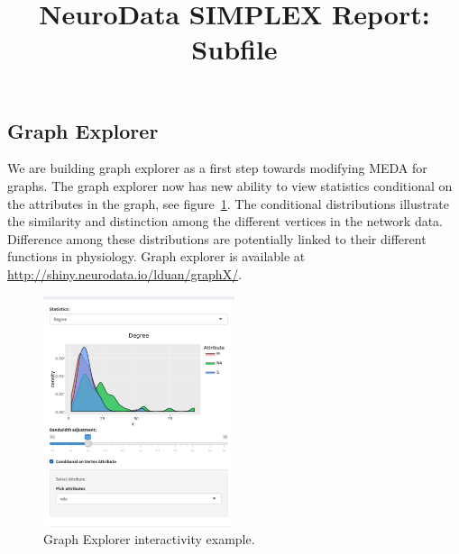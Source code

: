 \documentclass[simplex.tex]{subfiles}
\title{NeuroData SIMPLEX Report: Subfile}
\begin{document}

\subsection{Graph Explorer}

We are building graph explorer as a first step towards modifying MEDA for graphs.  
The graph explorer now has new ability to view statistics conditional on the attributes in the graph, see figure~\ref{fig:graphExplorer}. The conditional distributions illustrate
the similarity and distinction among the different vertices in the
network data. Difference among these distributions are potentially
linked to their different functions in physiology.
Graph explorer is available at \url{http://shiny.neurodata.io/lduan/graphX/}.


\begin{figure}[h!]
\begin{cframed}
\centering
\includegraphics[width=0.5\textwidth]{./figs/graph-explorer.png}
\caption{Graph Explorer interactivity example.}
\label{fig:graphExplorer}
\end{cframed}
\end{figure}
\end{document}
